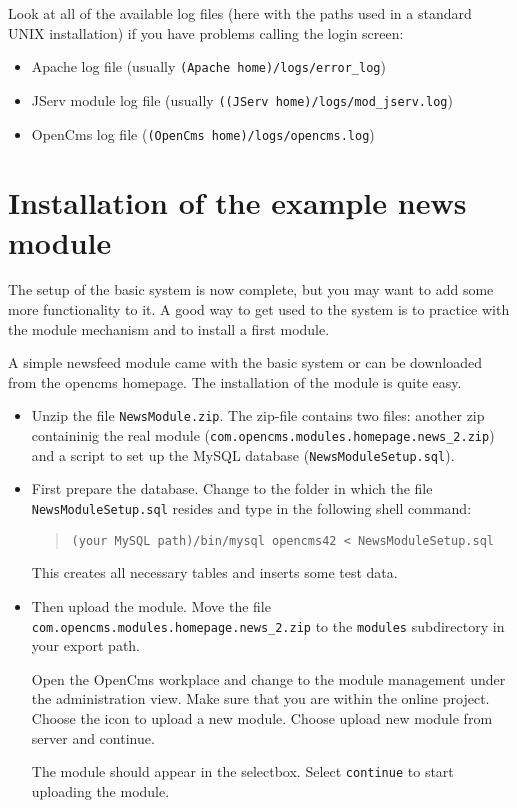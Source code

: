 Look at all of the available log files 
(here with the paths used in a standard UNIX installation) 
if you have problems calling the login screen: 

\begin{itemize}
\item Apache log file (usually \texttt{(Apache home)/logs/error\_log})
\item JServ module log file (usually \texttt{((JServ home)/logs/mod\_jserv.log})
\item OpenCms log file (\texttt{(OpenCms home)/logs/opencms.log})
\end{itemize}

\section{Installation of the example news module}

The setup of the basic system is now complete, but you may want
to add some more functionality to it.
A good way to get used to the system is to practice with the 
module mechanism and to install a first module. 

A simple newsfeed module came with the basic system or can be downloaded
from the opencms homepage. The installation of the module is quite easy.

\begin{itemize}
\item Unzip the file \texttt{NewsModule.zip}.
The zip-file contains two files: another zip containinig the real module 
(\texttt{com.opencms.modules.homepage.news\_2.zip})
and a script to set up the MySQL database (\texttt{NewsModuleSetup.sql}).

\item
First prepare the database.
Change to the folder in which the file \\
\texttt{NewsModuleSetup.sql} resides and type in the following shell command:

\begin{quote}
\texttt{(your MySQL path)/bin/mysql opencms42 < NewsModuleSetup.sql}
\end{quote}

This creates all necessary tables and inserts some test data.

\item Then upload the module.
Move the file \\
\texttt{com.opencms.modules.homepage.news\_2.zip} to the \texttt{modules}
subdirectory in your export path.

Open the OpenCms workplace and change to the module management under the
administration view.
Make sure that you are within the online project.
Choose the icon to upload a new module.
Choose upload new module from server and continue.

The module should appear in the selectbox. 
Select \texttt{continue} to start uploading the module.
\end{itemize}

